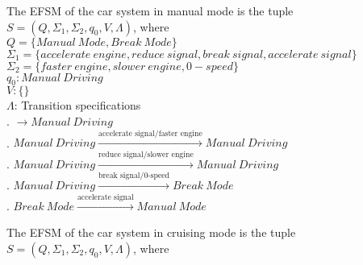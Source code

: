 \documentclass[12pt]{article}
\begin{document}
\begin{spacing}{1.5}
\newpage

\noindent The EFSM of the car system in manual mode is the tuple $S = (Q, \Sigma_1, \Sigma_2, q_0, V, \Lambda)$, where\\

\noindent $Q = \{Manual~Mode, Break~Mode\}$\\
\noindent $\Sigma_1 = \{accelerate~engine, reduce~signal, break~signal, accelerate~signal\}$\\
\noindent $\Sigma_2 = \{faster~engine, slower~engine, 0-speed\}$\\
\noindent $q_0: Manual~Driving$\\
\noindent $V: \{\}$\\
\noindent $\Lambda$: Transition specifications\\
. $\rightarrow Manual~Driving$\\
. $Manual~Driving \xrightarrow {\text {accelerate~signal/faster~engine}} Manual~Driving$\\
. $Manual~Driving \xrightarrow {\text {reduce~signal/slower~engine}} Manual~Driving$\\
. $Manual~Driving \xrightarrow {\text {break~signal/0-speed}} Break~Mode$\\
. $Break~Mode \xrightarrow {\text {accelerate~signal}} Manual~Mode$\\

\newpage

\noindent The EFSM of the car system in cruising mode is the tuple $S = (Q, \Sigma_1, \Sigma_2, q_0, V, \Lambda)$, where\\


\end{spacing}
\end{document}
